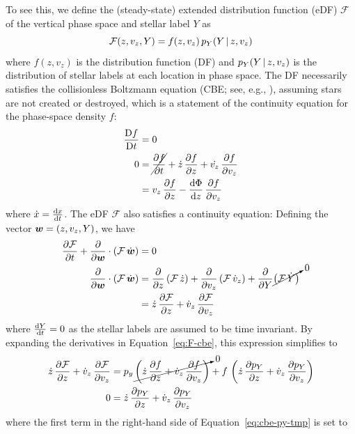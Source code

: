 \documentclass[modern]{aastex631}
\begin{document}
To see this, we define the (steady-state) extended distribution function (eDF)
$\mathcal{F}$ of the vertical phase space and stellar label $Y$ as
\begin{equation}
    \mathcal{F}(z, v_z, Y) = f(z, v_z) \, p_Y(Y \,|\, z, v_z)  \label{eq:edf}
\end{equation}
where $f(z, v_z)$ is the distribution function (DF) and $p_Y(Y \,|\, z, v_z)$ is the
distribution of stellar labels at each location in phase space.
The DF necessarily satisfies the collisionless Boltzmann equation (CBE; see, e.g.,
\citealt{Binney:2008}), assuming stars are not created or destroyed, which is a
statement of the continuity equation for the phase-space density $f$:
\begin{align}
    \frac{\mathrm{D}{f}}{\mathrm{D}{t}} &= 0 \\
    0 &= \cancel{\frac{\partial {f}}{\partial {t}}} + \dot{z} \, \frac{\partial {f}}{\partial {z}} + \dot{v_z} \, \frac{\partial {f}}{\partial {v_z}} \\
    &= v_z \, \frac{\partial {f}}{\partial {z}} - \frac{\mathrm{d}{\Phi}}{\mathrm{d}{z}} \, \frac{\partial {f}}{\partial {v_z}} \label{eq:cbe}
\end{align}
where $\dot{x} = \frac{\mathrm{d}{x}}{\mathrm{d}{t}}$.
The eDF $\mathcal{F}$ also satisfies a continuity equation: Defining the vector $\boldsymbol{w} = (z, v_z, Y)$, we have
\begin{align}
    \frac{\partial {\mathcal{F}}}{\partial {t}} + \frac{\partial {}}{\partial {\boldsymbol{w}}}
        \cdot (\mathcal{F} \, \dot{\boldsymbol{w}}) &= 0 \\
    \frac{\partial {}}{\partial {\boldsymbol{w}}} \cdot (\mathcal{F} \, \dot{\boldsymbol{w}}) &=
        \frac{\partial {}}{\partial {z}} \left(\mathcal{F} \, \dot{z}\right) +
        \frac{\partial {}}{\partial {v_z}} \left(\mathcal{F} \, \dot{v}_z\right) +
        \frac{\partial {}}{\partial {Y}} \cancelto{0}{\left(\mathcal{F} \, \dot{Y}\right)} \\
    &= \dot{z} \, \frac{\partial {\mathcal{F}}}{\partial {z}} + \dot{v}_z \, \frac{\partial {\mathcal{F}}}{\partial {v_z}}
    \label{eq:F-cbe}
\end{align}
where $\frac{\mathrm{d}{Y}}{\mathrm{d}{t}} = 0$ as the stellar labels are assumed to be time invariant.
By expanding the derivatives in Equation~\ref{eq:F-cbe}, this expression simplifies to
\begin{align}
    \dot{z} \, \frac{\partial {\mathcal{F}}}{\partial {z}} + \dot{v}_z \, \frac{\partial {\mathcal{F}}}{\partial {v_z}}
    &= p_y \,
    \cancelto{0}{\left(\dot{z} \, \frac{\partial {f}}{\partial {z}} + \dot{v}_z \, \frac{\partial {f}}{\partial {v_z}}\right)}
    + f \, \left(\dot{z} \, \frac{\partial {p_Y}}{\partial {z}} + \dot{v}_z \, \frac{\partial {p_Y}}{\partial {v_z}}\right)
    \label{eq:cbe-py-tmp} \\
    0 &= \dot{z} \, \frac{\partial {p_Y}}{\partial {z}} + \dot{v}_z \, \frac{\partial {p_Y}}{\partial {v_z}} \label{eq:cbe-py}
\end{align}
where the first term in the right-hand side of Equation~\ref{eq:cbe-py-tmp} is set to
\end{document}
